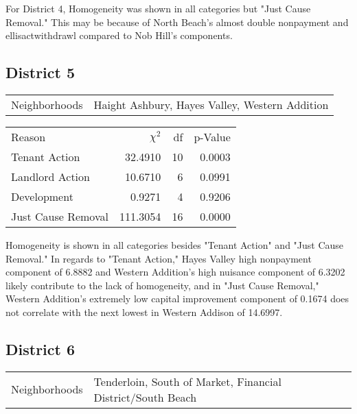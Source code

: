 \documentclass[]{article}
\begin{document}
For District 4, Homogeneity was shown in all categories but "Just Cause Removal." This may be because of North Beach's almost double nonpayment and ellisactwithdrawl compared to Nob Hill's components.

\subsection{District 5}

\begin{table}[!h]
	\centering
	\begin{tabular}{l | l}
		Neighborhoods & Haight Ashbury, Hayes Valley, Western Addition \\
	\end{tabular}
\end{table}
\FloatBarrier

\begin {table}[!h]
\centering
\begin{tabular}{l | r | r | r}
	
	Reason				&  $\chi ^{2}$ & df & p-Value \\
	Tenant Action 		   &  32.4910   &  10 & 0.0003 \\
	Landlord Action	       &  10.6710  & 6  & 0.0991 \\
	Development			   &  0.9271  &  4 & 0.9206 \\
	Just Cause Removal	   &  111.3054  & 16  & 0.0000 \\
\end{tabular} \newline
\end{table}
\FloatBarrier

Homogeneity is shown in all categories besides "Tenant Action" and "Just Cause Removal." In regards to "Tenant Action," Hayes Valley high nonpayment component of 6.8882 and Western Addition's high nuisance component of 6.3202 likely contribute to the lack of homogeneity, and in "Just Cause Removal," Western Addition's extremely low capital improvement component of 0.1674 does not correlate with the next lowest in Western Addison of 14.6997.

\subsection{District 6}


\begin{table}[!h]
	\centering
	\begin{tabular}{l | l}
		Neighborhoods & Tenderloin, South of Market, Financial District/South Beach  \\
	\end{tabular}
\end{table}
\FloatBarrier
\end{document}
